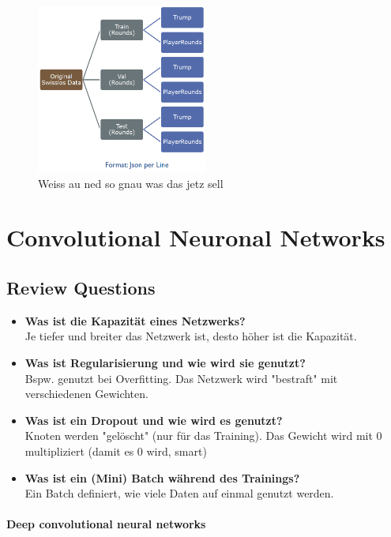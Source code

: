 \documentclass[a4paper]{article}
\begin{document}
		\begin{figure}[htb!]
			\centering
			\includegraphics[width=0.5\textwidth]{img/06_deep_nn/additional_data.png}
			\caption{Weiss au ned so gnau was das jetz sell}
		\end{figure}
		
	\newpage
	
	\section{Convolutional Neuronal Networks}
	
		\subsection{Review Questions}
		
		\begin{itemize}
			\item \textbf{Was ist die Kapazität eines Netzwerks?} \\
				Je tiefer und breiter das Netzwerk ist, desto höher ist die Kapazität.
			\item \textbf{Was ist Regularisierung und wie wird sie genutzt?} \\
				Bspw. genutzt bei Overfitting. Das Netzwerk wird "bestraft" mit verschiedenen Gewichten.
			\item \textbf{Was ist ein Dropout und wie wird es genutzt?} \\
				Knoten werden "gelöscht" (nur für das Training). Das Gewicht wird mit 0 multipliziert (damit es 0 wird, smart)
			\item \textbf{Was ist ein (Mini) Batch während des Trainings?} \\
				Ein Batch definiert, wie viele Daten auf einmal genutzt werden.
		\end{itemize}
	
		\paragraph{Deep convolutional neural networks}
		
\end{document}
